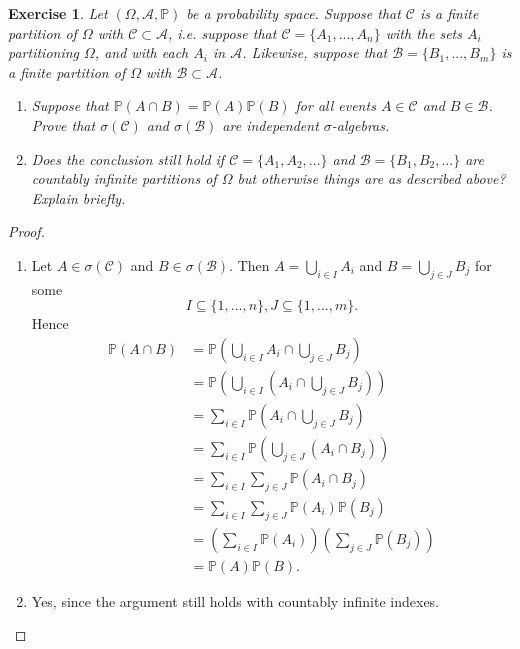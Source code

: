 \documentclass{article}
\newtheorem{exercise}[theorem]{Exercise}
\begin{document}
\begin{exercise}
Let $(\Omega,\mathcal{A},\mathbb{P})$ be a probability space. Suppose that $\mathcal{C}$ is a finite partition of $\Omega$ with $\mathcal{C}\subset\mathcal{A}$, i.e. suppose that $\mathcal{C}=\{A_1,...,A_n\}$ with the sets $A_i$ partitioning $\Omega$, and with each $A_i$ in $\mathcal{A}$. Likewise, suppose that $\mathcal{B}=\{B_1,...,B_m\}$ is a finite partition of $\Omega$ with $\mathcal{B}\subset\mathcal{A}$.
\begin{enumerate}
    \item[(a)] Suppose that $\mathbb{P}(A\cap B)=\mathbb{P}(A)\mathbb{P}(B)$ for all events $A\in\mathcal{C}$ and $B\in\mathcal{B}$. Prove that $\sigma(\mathcal{C})$ and $\sigma(\mathcal{B})$ are independent $\sigma$-algebras.
    \item[(b)] Does the conclusion still hold if $\mathcal{C}=\{A_1,A_2,...\}$ and $\mathcal{B}=\{B_1,B_2,...\}$ are countably infinite partitions of $\Omega$ but otherwise things are as described above? Explain briefly.
\end{enumerate}
\end{exercise}
\begin{proof}
\begin{enumerate}
    \item[(a)] Let $A\in\sigma(\mathcal{C})$ and $B\in\sigma(\mathcal{B})$. Then $A=\bigcup_{i\in I}A_i$ and $B=\bigcup_{j\in J}B_j$ for some \[I\subseteq\{1,...,n\},J\subseteq\{1,...,m\}.\] Hence \begin{align*}\mathbb{P}(A\cap B)&=\mathbb{P}\left(\bigcup_{i\in I}A_i\cap\bigcup_{j\in J}B_j\right)\\&=\mathbb{P}\left(\bigcup_{i\in I}\left(A_i\cap \bigcup_{j\in J}B_j\right)\right)\\&=\sum_{i\in I}\mathbb{P}\left(A_i\cap\bigcup_{j\in J}B_j\right)\\&=\sum_{i\in I}\mathbb{P}\left(\bigcup_{j\in J}(A_i\cap B_j)\right)\\&=\sum_{i\in I}\sum_{j\in J}\mathbb{P}(A_i\cap B_j)\\&=\sum_{i\in I}\sum_{j\in J}\mathbb{P}(A_i)\mathbb{P}(B_j)\\&=\left(\sum_{i\in I}\mathbb{P}(A_i)\right)\left(\sum_{j\in J}\mathbb{P}(B_j)\right)\\&=\mathbb{P}(A)\mathbb{P}(B).\end{align*}
    \item[(b)] Yes, since the argument still holds with countably infinite indexes.
\end{enumerate}
\end{proof}
\end{document}
